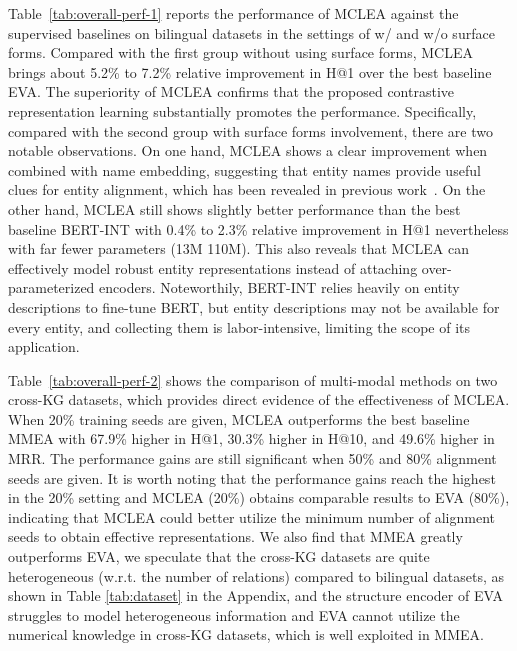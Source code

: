 \documentclass[11pt]{article}
\begin{document}
Table~\ref{tab:overall-perf-1} reports the performance of MCLEA against the supervised baselines on bilingual datasets in the settings of w/ and w/o surface forms.
Compared with the first group without using surface forms, MCLEA brings about 5.2\% to 7.2\% relative improvement in H@1 over the best baseline EVA.
The superiority of MCLEA confirms that the proposed contrastive representation learning substantially promotes the performance.
Specifically, compared with the second group with surface forms involvement, there are two notable observations.
On one hand, MCLEA shows a clear improvement when combined with name embedding, suggesting that entity names provide useful clues for entity alignment, which has been revealed in previous work~\cite{zhang2019multi,liu2020exploring, ge2021make}.
On the other hand, MCLEA still shows slightly better performance than the best baseline BERT-INT with 0.4\% to 2.3\% relative improvement in H@1 nevertheless with far fewer parameters (13M  110M).
This also reveals that MCLEA can effectively model robust entity representations instead of attaching over-parameterized encoders.
Noteworthily, BERT-INT relies heavily on entity descriptions to fine-tune BERT, but entity descriptions may not be available for every entity, and collecting them is labor-intensive, limiting the scope of its application.

Table~\ref{tab:overall-perf-2} shows the comparison of multi-modal methods on two cross-KG datasets, which provides direct evidence of the effectiveness of MCLEA.
When 20\% training seeds are given, MCLEA outperforms the best baseline MMEA with 67.9\% higher in H@1, 30.3\% higher in H@10, and 49.6\% higher in MRR.
The performance gains are still significant when 50\% and 80\% alignment seeds are given.
It is worth noting that the performance gains reach the highest in the 20\% setting and MCLEA (20\%) obtains comparable results to EVA (80\%), indicating that MCLEA could better utilize the minimum number of alignment seeds to obtain effective representations.
We also find that MMEA greatly outperforms EVA, we speculate that the cross-KG datasets are quite heterogeneous (w.r.t. the number of relations) compared to bilingual datasets, as shown in Table \ref{tab:dataset} in the Appendix, and the structure encoder of EVA struggles to model heterogeneous information and EVA cannot utilize the numerical knowledge in cross-KG datasets, which is well exploited in MMEA.
\end{document}
